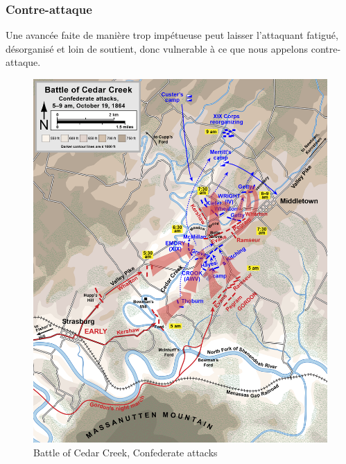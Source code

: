 \documentclass{article}
\begin{document}
\subsubsection{Contre-attaque}
Une avancée faite de manière trop impétueuse peut laisser l'attaquant fatigué, désorganisé et loin de soutient, donc vulnerable à ce que nous appelons \og{}contre-attaque\fg{}.
\begin{center}
\begin{figure}[H]
\hfill
\begin{minipage}[H]{0.5\linewidth}
	\centering
	\includegraphics[width=\linewidth]{../ressources/Cedar_Creek_Confederate_attacks}
	\caption{Battle of Cedar Creek, Confederate attacks}
\end{minipage}
\hfill
\begin{minipage}[H]{0.45\linewidth}
	\centering

\end{minipage}
\end{figure}
\end{center}
\end{document}
